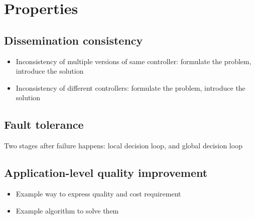 \section{Properties}

\subsection{Dissemination consistency}

\begin{itemize}
	\item Inconsistency of multiple versions of same controller: formulate the problem, introduce the solution
	\item Inconsistency of different controllers: formulate the problem, introduce the solution
\end{itemize}


\subsection{Fault tolerance}

Two stages after failure happens: local decision loop, and global decision loop


\subsection{Application-level quality improvement}
\begin{itemize}
	\item Example way to express quality and cost requirement
	\item Example algorithm to solve them
\end{itemize}
